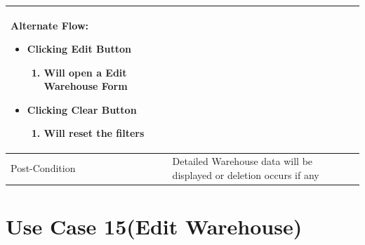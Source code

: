 \documentclass[12pt,a4paper]{report}
\begin{document}
\begin{tabular}{ | m{3cm} | m{12cm}| }
\begin{enumerate}
\end{enumerate}

Alternate Flow:

\begin{itemize}
\item Clicking Edit Button
	\begin{enumerate}
		\item Will open a Edit Warehouse Form
	\end{enumerate}
\item Clicking Clear Button
	\begin{enumerate}
	   	 \item	Will reset the filters
	\end{enumerate}
\end{itemize}
\\ \hline
Post-Condition &  Detailed Warehouse data will be displayed or deletion occurs if any   \\ \hline

\end{tabular}
\section{Use Case 15(Edit Warehouse) }
\end{document}
